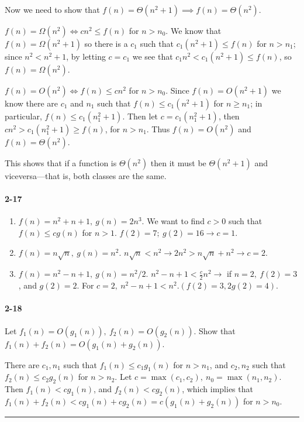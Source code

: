 \documentclass{report}
\newcommand{\okthen}{\rule[-1.4pt]{0.3em}{0.77em}}
\begin{document}
\smallskip

Now we need to show that $f(n) = \Theta(n^2+1) \implies f(n) = \Theta(n^2)$.

$f(n) = \Omega(n^2) \iff c n^2 \le f(n)$ for $n > n_0$. We know that $f(n) = \Omega(n^2+1)$ so there is a $c_1$ such that $c_1(n^2+1) \le f(n)$ for $n > n_1$; since $n^2 < n^2 + 1$, by letting $c = c_1$ we see that $c_1 n^2 < c_1 (n^2+1) \le f(n)$, so $f(n) = \Omega(n^2)$.

$f(n) = O(n^2) \iff f(n) \le c n^2$ for $n > n_0$. Since $f(n) = O(n^2 + 1)$ we know there are $c_1$ and $n_1$ such that $f(n) \le c_1(n^2+1)$ for $n \ge n_1$; in particular, $f(n) \le c_1(n_1^2+1)$. Then let $c = c_1(n_1^2+1)$, then $c n^2 > c_1(n_1^2+1) \ge f(n)$, for $n > n_1$. Thus $f(n) = O(n^2)$ and $f(n) = \Theta(n^2)$.

\smallskip

This shows that if a function is $\Theta(n^2)$ then it must be $\Theta(n^2+1)$ and viceversa---that is, both classes are the same.

\paragraph{2-17}
\begin{enumerate}[label=\alph*)]
	\item $f(n) = n^2 + n + 1,\ g(n) = 2n^3$. We want to find $c > 0$ such that $f(n) \le c g(n)$ for $n > 1$. $f(2) = 7;\ g(2) = 16 \to c = 1$.
	\item $f(n) = n\sqrt{n},\ g(n) = n^2$. $n\sqrt{n} < n^2 \to 2n^2 > n\sqrt{n} + n^2 \to c = 2$.
	\item $f(n) = n^2 - n + 1,\ g(n) = n^2/2$. $n^2 - n + 1 < \frac{c}{2}n^2 \to$ if $n = 2,\ f(2) = 3$, and $g(2) = 2$. For $c=2,\ n^2 - n + 1 < n^2. (f(2) = 3, 2g(2) = 4)$.
\end{enumerate}

\paragraph{2-18} Let $f_1(n) = O(g_1(n)),\ f_2(n) = O(g_2(n))$. Show that $f_1(n) + f_2(n) = O(g_1(n) + g_2(n))$.

\smallskip

There are $c_1, n_1$ such that $f_1(n) \le c_1 g_1(n)$ for $n > n_1$, and $c_2, n_2$ such that $f_2(n) \le c_2 g_2(n)$ for $n > n_2$. Let $c = \max(c_1, c_2),\ n_0 = \max(n_1, n_2)$. Then $f_1(n) < c g_1(n)$, and $f_2(n) < c g_2(n)$, which implies that $f_1(n) + f_2(n) < c g_1(n) + c g_2(n) = c(g_1(n) + g_2(n))$ for $n > n_0$.\ \okthen
\end{document}
